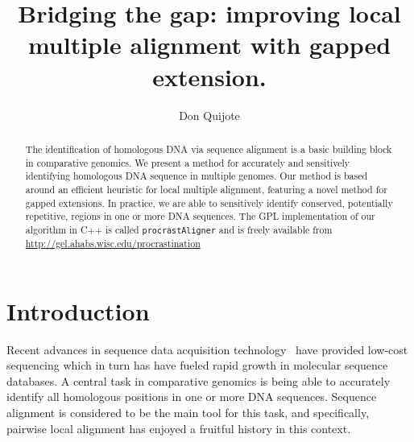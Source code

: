 \documentclass{llncs}
\begin{document}
\renewcommand{\labelenumi}{(\Alph{enumi})}
\renewcommand{\labelenumii}{(\alph{enumii})}

\frontmatter          %
%
\pagestyle{headings}  %

\mainmatter              %
%
\title{Bridging the gap: improving local multiple alignment with gapped extension.}
%
\author{Don Quijote}
%
%


\maketitle


\begin{abstract}
The identification of homologous DNA via sequence alignment is a basic building block in comparative genomics.  We present a method for accurately and sensitively identifying homologous DNA sequence in multiple genomes. Our method is based around an efficient heuristic for local multiple alignment, featuring a novel method for gapped extensions. In practice, we are able to sensitively identify conserved, potentially repetitive, regions in one or more DNA sequences.  The GPL implementation of our algorithm in C++ is
called \texttt{procrastAligner} and is freely available from
\url{http://gel.ahabs.wisc.edu/procrastination}
\end{abstract}




\section{ Introduction }

Recent advances in sequence data acquisition technology~\cite{ref-454} have provided low-cost sequencing which in turn has
have fueled rapid growth in molecular sequence databases. A central task in comparative genomics is being able to accurately identify all homologous positions in one or more DNA sequences.  Sequence alignment is considered to be the main tool for this task, and specifically, pairwise local alignment has enjoyed a fruitful history in this context.
\end{document}
